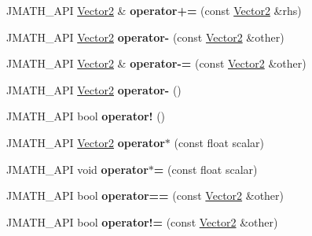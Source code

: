 \begin{DoxyCompactItemize}
\item 
\hypertarget{class_vector2_a98048795be460f94d42281577ced83e0}{J\+M\+A\+T\+H\+\_\+\+A\+P\+I \hyperlink{class_vector2}{Vector2} \& {\bfseries operator+=} (const \hyperlink{class_vector2}{Vector2} \&rhs)}\label{class_vector2_a98048795be460f94d42281577ced83e0}

\item 
\hypertarget{class_vector2_a022aa0c0f65411818bc9e13d239631a2}{J\+M\+A\+T\+H\+\_\+\+A\+P\+I \hyperlink{class_vector2}{Vector2} {\bfseries operator-\/} (const \hyperlink{class_vector2}{Vector2} \&other)}\label{class_vector2_a022aa0c0f65411818bc9e13d239631a2}

\item 
\hypertarget{class_vector2_a61de61782c7dc2f41c3936178700183c}{J\+M\+A\+T\+H\+\_\+\+A\+P\+I \hyperlink{class_vector2}{Vector2} \& {\bfseries operator-\/=} (const \hyperlink{class_vector2}{Vector2} \&other)}\label{class_vector2_a61de61782c7dc2f41c3936178700183c}

\item 
\hypertarget{class_vector2_a45a076b750cc8249aafbab2f0ff23b34}{J\+M\+A\+T\+H\+\_\+\+A\+P\+I \hyperlink{class_vector2}{Vector2} {\bfseries operator-\/} ()}\label{class_vector2_a45a076b750cc8249aafbab2f0ff23b34}

\item 
\hypertarget{class_vector2_a61455b3c7aa42ff1d9fe698ae4a9bf44}{J\+M\+A\+T\+H\+\_\+\+A\+P\+I bool {\bfseries operator!} ()}\label{class_vector2_a61455b3c7aa42ff1d9fe698ae4a9bf44}

\item 
\hypertarget{class_vector2_aa8b4653581cb108d637cdf8df8ac8e0f}{J\+M\+A\+T\+H\+\_\+\+A\+P\+I \hyperlink{class_vector2}{Vector2} {\bfseries operator$\ast$} (const float scalar)}\label{class_vector2_aa8b4653581cb108d637cdf8df8ac8e0f}

\item 
\hypertarget{class_vector2_a9bfb08e2fe10afc79506b7d1161b0375}{J\+M\+A\+T\+H\+\_\+\+A\+P\+I void {\bfseries operator$\ast$=} (const float scalar)}\label{class_vector2_a9bfb08e2fe10afc79506b7d1161b0375}

\item 
\hypertarget{class_vector2_af484a501fe5f822e192643d2c4a17631}{J\+M\+A\+T\+H\+\_\+\+A\+P\+I bool {\bfseries operator==} (const \hyperlink{class_vector2}{Vector2} \&other)}\label{class_vector2_af484a501fe5f822e192643d2c4a17631}

\item 
\hypertarget{class_vector2_a8cec9d2176e93cd83f0e99474837e1f4}{J\+M\+A\+T\+H\+\_\+\+A\+P\+I bool {\bfseries operator!=} (const \hyperlink{class_vector2}{Vector2} \&other)}\label{class_vector2_a8cec9d2176e93cd83f0e99474837e1f4}


\end{DoxyCompactItemize}
